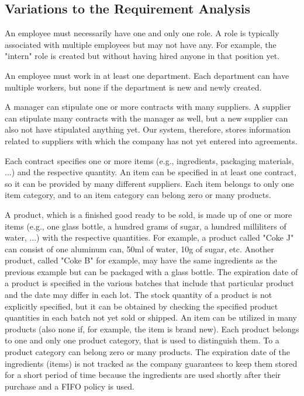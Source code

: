 \subsection{Variations to the Requirement Analysis}


An employee must necessarily have one and only one role. A role is typically associated with multiple employees but may not have any. For example, the "intern" role is created but without having hired anyone in that position yet.

An employee must work in at least one department. Each department can have multiple workers, but none if the department is new and newly created.

A manager can stipulate one or more contracts with many suppliers. A supplier can stipulate many contracts with the manager as well, but a new supplier can also not have stipulated anything yet. Our system, therefore, stores information related to suppliers with which the company has not yet entered into agreements.

Each contract specifies one or more items (e.g., ingredients, packaging materials, ...) and the respective quantity. An item can be specified in at least one contract, so it can be provided by many different suppliers. Each item belongs to only one item category, and to an item category can belong zero or many products.

A product, which is a finished good ready to be sold, is made up of one or more items (e.g., one glass bottle, a hundred grams of sugar, a hundred milliliters of water, ...) with the respective quantities. For example, a product called "Coke J" can consist of one aluminum can, 50ml of water, 10g of sugar, etc. Another product, called "Coke B" for example, may have the same ingredients as the previous example but can be packaged with a glass bottle. The expiration date of a product is specified in the various batches that include that particular product and the date may differ in each lot. The stock quantity of a product is not explicitly specified, but it can be obtained by checking the specified product quantities in each batch not yet sold or shipped. An item can be utilized in many products (also none if, for example, the item is brand new). Each product belongs to one and only one product category, that is used to distinguish them. To a product category can belong zero or many products. The expiration date of the ingredients (items) is not tracked as the company guarantees to keep them stored for a short period of time because the ingredients are used shortly after their purchase and a FIFO policy is used.

